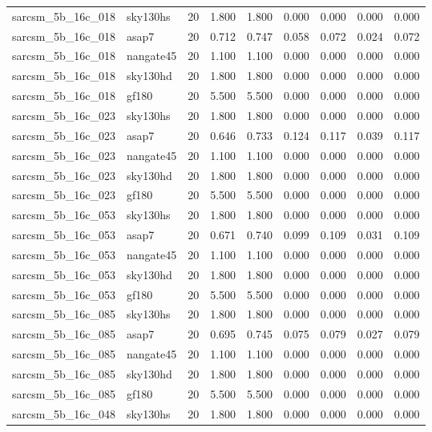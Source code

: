 \begin{tabular}{llrrrrrrr}
sarcsm\_5b\_16c\_018 & sky130hs & 20 & 1.800 & 1.800 & 0.000 & 0.000 & 0.000 & 0.000 \\
sarcsm\_5b\_16c\_018 & asap7 & 20 & 0.712 & 0.747 & 0.058 & 0.072 & 0.024 & 0.072 \\
sarcsm\_5b\_16c\_018 & nangate45 & 20 & 1.100 & 1.100 & 0.000 & 0.000 & 0.000 & 0.000 \\
sarcsm\_5b\_16c\_018 & sky130hd & 20 & 1.800 & 1.800 & 0.000 & 0.000 & 0.000 & 0.000 \\
sarcsm\_5b\_16c\_018 & gf180 & 20 & 5.500 & 5.500 & 0.000 & 0.000 & 0.000 & 0.000 \\
sarcsm\_5b\_16c\_023 & sky130hs & 20 & 1.800 & 1.800 & 0.000 & 0.000 & 0.000 & 0.000 \\
sarcsm\_5b\_16c\_023 & asap7 & 20 & 0.646 & 0.733 & 0.124 & 0.117 & 0.039 & 0.117 \\
sarcsm\_5b\_16c\_023 & nangate45 & 20 & 1.100 & 1.100 & 0.000 & 0.000 & 0.000 & 0.000 \\
sarcsm\_5b\_16c\_023 & sky130hd & 20 & 1.800 & 1.800 & 0.000 & 0.000 & 0.000 & 0.000 \\
sarcsm\_5b\_16c\_023 & gf180 & 20 & 5.500 & 5.500 & 0.000 & 0.000 & 0.000 & 0.000 \\
sarcsm\_5b\_16c\_053 & sky130hs & 20 & 1.800 & 1.800 & 0.000 & 0.000 & 0.000 & 0.000 \\
sarcsm\_5b\_16c\_053 & asap7 & 20 & 0.671 & 0.740 & 0.099 & 0.109 & 0.031 & 0.109 \\
sarcsm\_5b\_16c\_053 & nangate45 & 20 & 1.100 & 1.100 & 0.000 & 0.000 & 0.000 & 0.000 \\
sarcsm\_5b\_16c\_053 & sky130hd & 20 & 1.800 & 1.800 & 0.000 & 0.000 & 0.000 & 0.000 \\
sarcsm\_5b\_16c\_053 & gf180 & 20 & 5.500 & 5.500 & 0.000 & 0.000 & 0.000 & 0.000 \\
sarcsm\_5b\_16c\_085 & sky130hs & 20 & 1.800 & 1.800 & 0.000 & 0.000 & 0.000 & 0.000 \\
sarcsm\_5b\_16c\_085 & asap7 & 20 & 0.695 & 0.745 & 0.075 & 0.079 & 0.027 & 0.079 \\
sarcsm\_5b\_16c\_085 & nangate45 & 20 & 1.100 & 1.100 & 0.000 & 0.000 & 0.000 & 0.000 \\
sarcsm\_5b\_16c\_085 & sky130hd & 20 & 1.800 & 1.800 & 0.000 & 0.000 & 0.000 & 0.000 \\
sarcsm\_5b\_16c\_085 & gf180 & 20 & 5.500 & 5.500 & 0.000 & 0.000 & 0.000 & 0.000 \\
sarcsm\_5b\_16c\_048 & sky130hs & 20 & 1.800 & 1.800 & 0.000 & 0.000 & 0.000 & 0.000 \\

\end{tabular}
